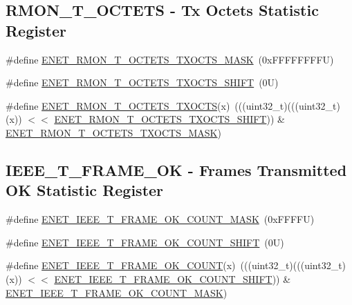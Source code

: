 \subsection*{R\+M\+O\+N\+\_\+\+T\+\_\+\+O\+C\+T\+E\+TS -\/ Tx Octets Statistic Register}
\begin{DoxyCompactItemize}
\item 
\#define \mbox{\hyperlink{group___e_n_e_t___register___masks_ga5ad525f27fd78ec68eefefbff4b87b3a}{E\+N\+E\+T\+\_\+\+R\+M\+O\+N\+\_\+\+T\+\_\+\+O\+C\+T\+E\+T\+S\+\_\+\+T\+X\+O\+C\+T\+S\+\_\+\+M\+A\+SK}}~(0x\+F\+F\+F\+F\+F\+F\+F\+F\+U)
\item 
\#define \mbox{\hyperlink{group___e_n_e_t___register___masks_gacd37d2d1ea131990ecfbae1a3c933f92}{E\+N\+E\+T\+\_\+\+R\+M\+O\+N\+\_\+\+T\+\_\+\+O\+C\+T\+E\+T\+S\+\_\+\+T\+X\+O\+C\+T\+S\+\_\+\+S\+H\+I\+FT}}~(0\+U)
\item 
\#define \mbox{\hyperlink{group___e_n_e_t___register___masks_ga26928891c693eebf6309fdb2e2152615}{E\+N\+E\+T\+\_\+\+R\+M\+O\+N\+\_\+\+T\+\_\+\+O\+C\+T\+E\+T\+S\+\_\+\+T\+X\+O\+C\+TS}}(x)~(((uint32\+\_\+t)(((uint32\+\_\+t)(x)) $<$$<$ \mbox{\hyperlink{group___e_n_e_t___register___masks_gacd37d2d1ea131990ecfbae1a3c933f92}{E\+N\+E\+T\+\_\+\+R\+M\+O\+N\+\_\+\+T\+\_\+\+O\+C\+T\+E\+T\+S\+\_\+\+T\+X\+O\+C\+T\+S\+\_\+\+S\+H\+I\+FT}})) \& \mbox{\hyperlink{group___e_n_e_t___register___masks_ga5ad525f27fd78ec68eefefbff4b87b3a}{E\+N\+E\+T\+\_\+\+R\+M\+O\+N\+\_\+\+T\+\_\+\+O\+C\+T\+E\+T\+S\+\_\+\+T\+X\+O\+C\+T\+S\+\_\+\+M\+A\+SK}})
\end{DoxyCompactItemize}
\subsection*{I\+E\+E\+E\+\_\+\+T\+\_\+\+F\+R\+A\+M\+E\+\_\+\+OK -\/ Frames Transmitted OK Statistic Register}
\begin{DoxyCompactItemize}
\item 
\#define \mbox{\hyperlink{group___e_n_e_t___register___masks_ga23f952e4fec141cb90d9847d74dd50f0}{E\+N\+E\+T\+\_\+\+I\+E\+E\+E\+\_\+\+T\+\_\+\+F\+R\+A\+M\+E\+\_\+\+O\+K\+\_\+\+C\+O\+U\+N\+T\+\_\+\+M\+A\+SK}}~(0x\+F\+F\+F\+F\+U)
\item 
\#define \mbox{\hyperlink{group___e_n_e_t___register___masks_gab12c920d9e9f6383e5981fb59764e3a9}{E\+N\+E\+T\+\_\+\+I\+E\+E\+E\+\_\+\+T\+\_\+\+F\+R\+A\+M\+E\+\_\+\+O\+K\+\_\+\+C\+O\+U\+N\+T\+\_\+\+S\+H\+I\+FT}}~(0\+U)
\item 
\#define \mbox{\hyperlink{group___e_n_e_t___register___masks_ga0d9fd1a5ed3e423377b644d61c9ee6a4}{E\+N\+E\+T\+\_\+\+I\+E\+E\+E\+\_\+\+T\+\_\+\+F\+R\+A\+M\+E\+\_\+\+O\+K\+\_\+\+C\+O\+U\+NT}}(x)~(((uint32\+\_\+t)(((uint32\+\_\+t)(x)) $<$$<$ \mbox{\hyperlink{group___e_n_e_t___register___masks_gab12c920d9e9f6383e5981fb59764e3a9}{E\+N\+E\+T\+\_\+\+I\+E\+E\+E\+\_\+\+T\+\_\+\+F\+R\+A\+M\+E\+\_\+\+O\+K\+\_\+\+C\+O\+U\+N\+T\+\_\+\+S\+H\+I\+FT}})) \& \mbox{\hyperlink{group___e_n_e_t___register___masks_ga23f952e4fec141cb90d9847d74dd50f0}{E\+N\+E\+T\+\_\+\+I\+E\+E\+E\+\_\+\+T\+\_\+\+F\+R\+A\+M\+E\+\_\+\+O\+K\+\_\+\+C\+O\+U\+N\+T\+\_\+\+M\+A\+SK}})
\end{DoxyCompactItemize}
